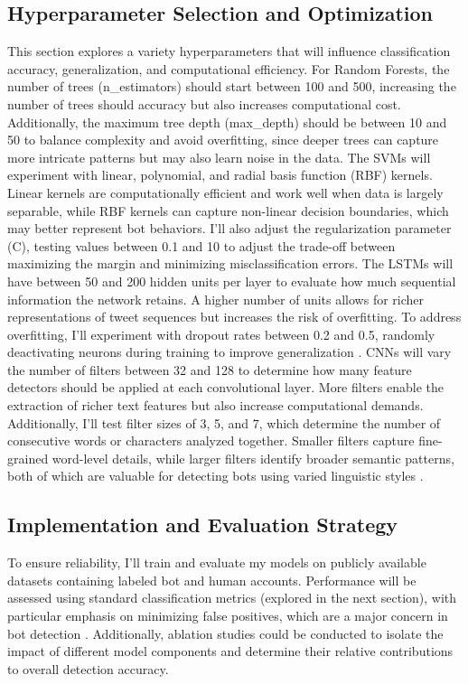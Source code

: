 \documentclass[10pt,twocolumn]{article}
\begin{document}
\subsection{Hyperparameter Selection and Optimization}
This section explores a variety hyperparameters that will influence classification accuracy, generalization, and computational efficiency. For Random Forests, the number of trees (n\_estimators) should start between 100 and 500, increasing the number of trees should accuracy but also increases computational cost. Additionally, the maximum tree depth (max\_depth) should be between 10 and 50 to balance complexity and avoid overfitting, since deeper trees can capture more intricate patterns but may also learn noise in the data. The SVMs will experiment with linear, polynomial, and radial basis function (RBF) kernels. Linear kernels are computationally efficient and work well when data is largely separable, while RBF kernels can capture non-linear decision boundaries, which may better represent bot behaviors. I’ll also adjust the regularization parameter (C), testing values between 0.1 and 10 to adjust the trade-off between maximizing the margin and minimizing misclassification errors. The LSTMs will have between 50 and 200 hidden units per layer to evaluate how much sequential information the network retains. A higher number of units allows for richer representations of tweet sequences but increases the risk of overfitting. To address overfitting, I’ll experiment with dropout rates between 0.2 and 0.5, randomly deactivating neurons during training to improve generalization \cite{Wei2020}. CNNs will vary the number of filters between 32 and 128 to determine how many feature detectors should be applied at each convolutional layer. More filters enable the extraction of richer text features but also increase computational demands. Additionally, I’ll test filter sizes of 3, 5, and 7, which determine the number of consecutive words or characters analyzed together. Smaller filters capture fine-grained word-level details, while larger filters identify broader semantic patterns, both of which are valuable for detecting bots using varied linguistic styles \cite{Wei2020}.

\subsection{Implementation and Evaluation Strategy}
To ensure reliability, I’ll train and evaluate my models on publicly available datasets containing labeled bot and human accounts. Performance will be assessed using standard classification metrics (explored in the next section), with particular emphasis on minimizing false positives, which are a major concern in bot detection \cite{Rauchfleisch2020}. Additionally, ablation studies could be conducted to isolate the impact of different model components and determine their relative contributions to overall detection accuracy.
\end{document}
